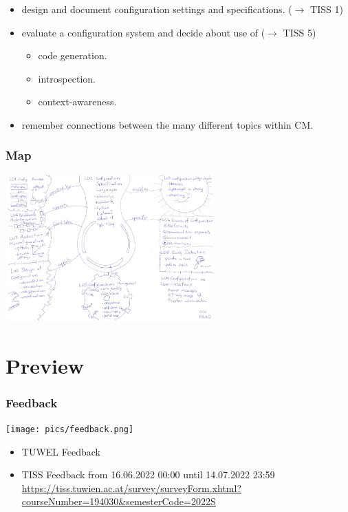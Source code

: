 \begin{frame}
\begin{itemize}
	\item design and document configuration settings and specifications.
	($\rightarrow$ TISS 1)
	\item evaluate a configuration system and decide about use of
	($\rightarrow$ TISS 5)
	\begin{itemize}
	\tiny
	\item code generation.
	\item introspection.
	\item context-awareness.
	\end{itemize}

	\item remember connections between the many different topics within CM.
	\end{itemize}
\end{frame}

\begin{frame}
	\frametitle{Map}

	\vspace{-0.5cm}
	\includegraphics[width=8cm]{pics/map.pdf}
\end{frame}

\section{Preview}


\begin{frame}
	\frametitle{Feedback}
	\hfill \texttt{[image: pics/feedback.png]}
	\vspace{-1cm}
	\begin{itemize}
		\item TUWEL Feedback %
		\vspace{0.2cm}
		\item TISS Feedback \linebreak
		{\small from 16.06.2022 00:00 until 14.07.2022 23:59
		\scriptsize \url{https://tiss.tuwien.ac.at/survey/surveyForm.xhtml?courseNumber=194030&semesterCode=2022S}}
	\end{itemize}
\end{frame}

